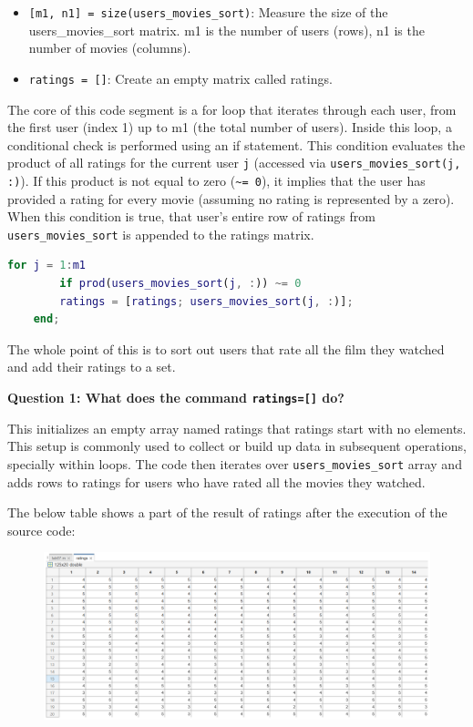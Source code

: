 \begin{itemize}[label=-]
	\item \texttt{[m1, n1] = size(users\_movies\_sort)}: Measure the size of the users\_movies\_sort matrix. m1 is the number of users (rows), n1 is the number of movies (columns).
	\item \texttt{ratings = []}: Create an empty matrix called ratings.
\end{itemize}

The core of this code segment is a for loop that iterates through each user, from the first user (index 1) up to m1 (the total number of users). Inside this loop, a conditional check is performed using an if statement. This condition evaluates the product of all ratings for the current user \texttt{j} (accessed via \texttt{users\_movies\_sort(j, :)}). If this product is not equal to zero (\texttt{\textasciitilde = 0}), it implies that the user has provided a rating for every movie (assuming no rating is represented by a zero). When this condition is true, that user's entire row of ratings from \texttt{users\_movies\_sort} is appended to the ratings matrix.

\begin{lstlisting}[language=MATLAB]
	for j = 1:m1                         
		if prod(users_movies_sort(j, :)) ~= 0  
		ratings = [ratings; users_movies_sort(j, :)];  
	end;
\end{lstlisting}

The whole point of this is to sort out users that rate all the film they watched and add their ratings to a set.

\textbf{Question 1: What does the command \texttt{ratings=[]} do?}

This initializes an empty array named ratings that ratings start with no elements. This setup is commonly used to collect or build up data in subsequent operations, specially 
within loops. The code then iterates over \texttt{users\_movies\_sort} array and adds rows to ratings for users who have rated all the movies they watched.

The below table shows a part of the result of ratings after the execution of the source code:

\begin{figure}[H]
	\centering
	\includegraphics[width=.9\linewidth]{sections/pic/section3/2.png}
\end{figure}

